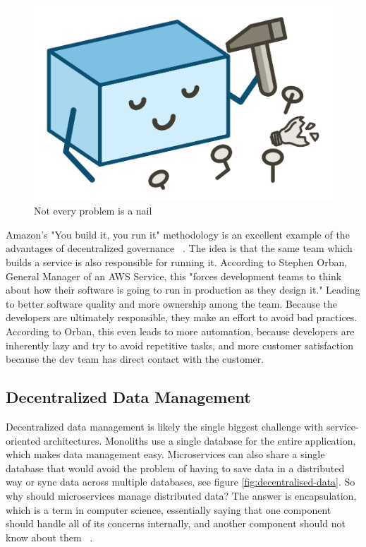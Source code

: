 \begin{figure}[ht]
  \centering
  \includegraphics[width=0.4\linewidth]{assets/illustration-monolith-hammer.png}
  \caption{Not every problem is a nail}
\end{figure}

Amazon's "You build it, you run it" methodology is an excellent example of the advantages of decentralized governance ~\cite{amazon.2015}. The idea is that the same team which builds a service is also responsible for running it. According to Stephen Orban, General Manager of an AWS Service, this "forces development teams to think about how their software is going to run in production as they design it." Leading to better software quality and more ownership among the team. Because the developers are ultimately responsible,  they make an effort to avoid bad practices. According to Orban, this even leads to more automation, because developers are inherently lazy and try to avoid repetitive tasks, and more customer satisfaction because the dev team has direct contact with the customer.


\subsection{Decentralized Data Management}
\label{sec:theory:decentralized-data}

Decentralized data management is likely the single biggest challenge with service-oriented architectures. Monoliths use a single database for the entire application, which makes data management easy. Microservices can also share a single database that would avoid the problem of having to save data in a distributed way or sync data across multiple databases, see figure \ref{fig:decentralised-data}. So why should microservices manage distributed data? The answer is encapsulation, which is a term in computer science, essentially saying that one component should handle all of its concerns internally, and another component should not know about them ~\cite{krivtsov.2019}.

